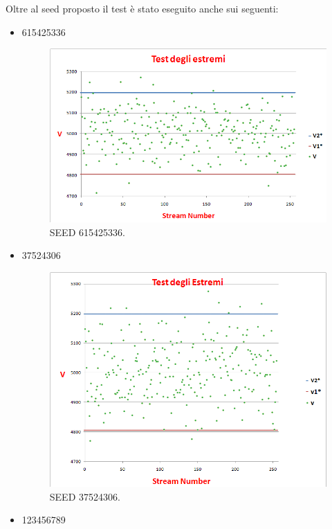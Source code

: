 \noindent Oltre al seed proposto il test è stato eseguito anche sui seguenti:
\begin{itemize}
\item 615425336
\begin{figure}[H]
  \centering
  \includegraphics[scale=0.55]{img/result_615425336.png}
  \caption[Test degli estremi]{SEED 615425336.}
  \label{fig:result_615425336}
\end{figure}
\item 37524306
\begin{figure}[H]
  \centering
  \includegraphics[scale=0.5]{img/result_37524306.png}
  \caption[Test degli estremi]{SEED 37524306.}
  \label{fig:result_37524306}
\end{figure}
\item 123456789
\begin{figure}[H]

\end{figure}
\end{itemize}
